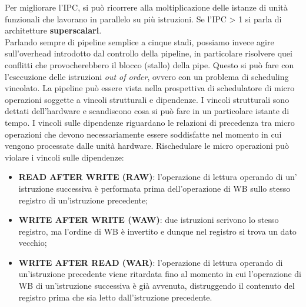 \begin{figure}[ht]
    \centering
    \setlength{\fboxrule}{0.5pt} %
    \setlength{\fboxsep}{0pt}    %
\end{figure}

\noindent
Per migliorare l'IPC, si può ricorrere alla moltiplicazione delle istanze di unità funzionali che lavorano in parallelo su più istruzioni. Se l'IPC > 1 si parla di architetture \textbf{superscalari}. \\ \noindent Parlando sempre di pipeline semplice a cinque stadi, possiamo invece agire sull'overhead introdotto dal controllo della pipeline, in particolare risolvere quei conflitti che provocherebbero il blocco (stallo) della pipe. Questo si può fare con l'esecuzione delle istruzioni \textit{out of order}, ovvero con un problema di scheduling vincolato. La pipeline può essere vista nella prospettiva di schedulatore di micro operazioni soggette a vincoli strutturali e dipendenze. I vincoli strutturali sono dettati dell'hardware e scandiscono cosa si può fare in un particolare istante di tempo. I vincoli sulle dipendenze riguardano le relazioni di precedenza tra micro operazioni che devono necessariamente essere soddisfatte nel momento in cui vengono processate dalle unità hardware. 
Rischedulare le micro operazioni può violare i vincoli sulle dipendenze:


\begin{itemize}
    \item \textbf{READ AFTER WRITE (RAW)}: l'operazione di lettura operando di un' istruzione successiva è performata prima dell'operazione di WB sullo stesso registro di un'istruzione precedente;
    \item \textbf{WRITE AFTER WRITE (WAW)}: due istruzioni scrivono lo stesso registro, ma l'ordine di WB è invertito e dunque nel registro si trova un dato vecchio; 
    \item \textbf{WRITE AFTER READ (WAR)}: l'operazione di lettura operando di un'istruzione precedente viene ritardata fino al momento in cui l'operazione di WB di un'istruzione successiva è già avvenuta, distruggendo il contenuto del registro prima che sia letto dall'istruzione precedente.
\end{itemize}


